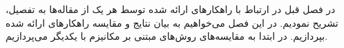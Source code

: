 \label{conclusion}
در فصل قبل در ارتباط با راهکار‌های ارائه شده توسط هر یک از مقاله‌ها به تفصیل، تشریح نمودیم. در این فصل می‌خواهیم به بیان نتایج و مقایسه راهکارهای ارائه شده بپردازیم. در ابتدا به مقایسه‌های روش‌های مبتنی بر مکانیزم  با یکدیگر می‌پردازیم.
